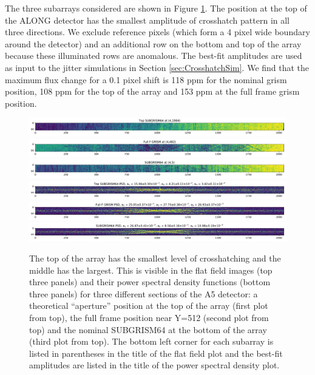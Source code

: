 \documentclass{aastex62}
\begin{document}
The three subarrays considered are shown in Figure \ref{fig:subpixScanSimulation}.
The position at the top of the ALONG detector has the smallest amplitude of crosshatch pattern in all three directions.
We exclude reference pixels (which form a 4 pixel wide boundary around the detector) and an additional row on the bottom and top of the array because these illuminated rows are anomalous.
The best-fit amplitudes are used as input to the jitter simulations in Section \ref{sec:CrosshatchSim}.
We find that the maximum flux change for a 0.1 pixel shift is 118 ppm for the nominal grism position, 108 ppm for the top of the array and 153 ppm at the full frame grism position.

\begin{figure}[!hbtp]
\centering
\includegraphics[width=0.99\columnwidth]{subg_pos_topGrism64.pdf}\\
\includegraphics[width=0.99\columnwidth]{subg_pos_fullfGrismRegion.pdf}\\
\includegraphics[width=0.99\columnwidth]{subg_pos_subgrism64.pdf}\\
\vspace{0.2in}
\includegraphics[width=0.99\columnwidth]{subg_pos_topGrism64_psd.pdf}\\
\includegraphics[width=0.99\columnwidth]{subg_pos_fullfGrismRegion_psd.pdf}\\
\includegraphics[width=0.99\columnwidth]{subg_pos_subgrism64_psd.pdf}\\
\caption{
The top of the array has the smallest level of crosshatching and the middle has the largest.
This is visible in the flat field images (top three panels) and their power spectral density functions (bottom three panels) for three different sections of the A5 detector: a theoretical ``aperture'' position at the top of the array (first plot from top), the full frame position near Y=512 (second plot from top) and the nominal SUBGRISM64 at the bottom of the array (third plot from top).
The bottom left corner for each subarray is listed in parentheses in the title of the flat field plot and the best-fit amplitudes are listed in the title of the power spectral density plot.
 }\label{fig:subpixScanSimulation}
\end{figure}
\end{document}
